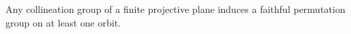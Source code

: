 Any collineation group of a finite projective plane induces a faithful permutation group on at least one orbit.
